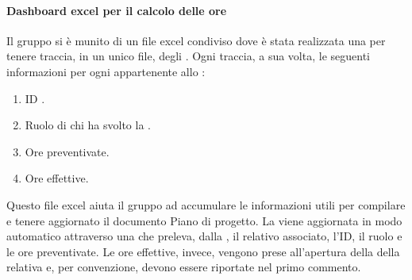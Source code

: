 \paragraph{Dashboard excel per il calcolo delle ore}
Il gruppo si è munito di un file excel condiviso dove è stata realizzata una  per tenere traccia, in un unico file, degli . Ogni  traccia, a sua volta, le seguenti informazioni per ogni  appartenente allo :
\begin{enumerate}
    \item ID .
    \item Ruolo di chi ha svolto la .
    \item Ore preventivate.
    \item Ore effettive.
\end{enumerate}
Questo file excel aiuta il gruppo ad accumulare le informazioni utili per compilare e tenere aggiornato il documento Piano di progetto.
La  viene aggiornata in modo automatico attraverso una  che preleva, dalla , il relativo  associato, l’ID,
 il ruolo e le ore preventivate. Le ore effettive, invece, vengono prese all'apertura della  della relativa  e, per convenzione, devono essere riportate nel primo commento.

